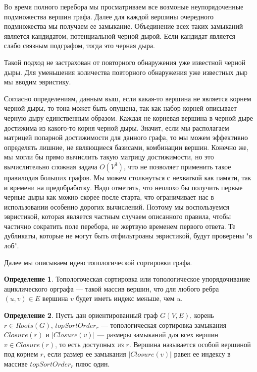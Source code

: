 \documentclass[12pt,a4paper,oneside]{article}
\theoremstyle{definition}
\newtheorem{definition}{Определение}[]
\theoremstyle{lemma}
\theoremstyle{remark}
\begin{document}
Во время полного перебора мы просматриваем все возмоные неупорядоченные подмножества вершин графа. Далее для каждой вершины очередного подмножества мы получаем ее замыкание. Объединение всех таких замыканий является кандидатом, потенциальной черной дырой. Если кандидат является слабо связным подграфом, тогда это черная дыра.

Такой подход не застрахован от повторного обнаружения уже известной черной дыры. Для уменьшения количества повторного обнаружения уже известных дыр мы вводим эвристику.

Согласно определениям, данным выш, если какая-то вершина не является корнем черной дыры, то тона может быть опущена, так как набор корней описывает черную дыру единственным образом. Каждая не корневая вершина в черной дыре достижима из какого-то корня черной дыры. Значит, если мы располагаем матрицей попарной достижимости для данного графа, то мы можем эффективно определять лишние, не являющиеся базисами, комбинации вершин. Конечно же, мы могли бы прямо вычислить такую матрицу достижимости, но это вычислительно сложная задача $O(V^3)$, что не позволяет применить такое правилодля больших графов. Мы можем столкнуться с нехваткой как памяти, так и времени  на предобработку. Надо отметить, что неплохо бы получить первые черные дыры как можно скорее после старта, что ограничивает нас в использовании особенно дорогих вычислений. Поэтому мы воспользуемся эвристикой, которая является частным случаем описанного правила, чтобы частично сократить поле перебора, не жертвую временем первого ответа. Те дубликаты, которые не могут быть отфильтроаны эвристикой, будут проверены "в лоб".

Далее мы описываем идею топологической сортировки графа.

\begin{definition}
Топологоческая сортировка или топологическое упорядочивание ациклического орграфа --- такой массив вершин, что для любого ребра $(u,v) \in E$ вершина $v$ будет иметь индекс меньше, чем $u$.
\end{definition}

\begin{definition}
Пусть дан ориентированный граф $G(V,E)$, корень $r \in Roots(G)$, $topSortOrder_r$ ---
топологическая сортировка замыкания $Closure(r)$ и $|Closure(v)|$ ---
размеры замыканий для всех вершин $v \in Closure(r)$, то есть доступных из $r$.
Вершина называется особой вершиной под корнем $r$, если размер ее замыкания $|Closure(v)|$ равен ее индексу в массиве $topSortOrder_r$ плюс один.
\end{definition}
\end{document}
